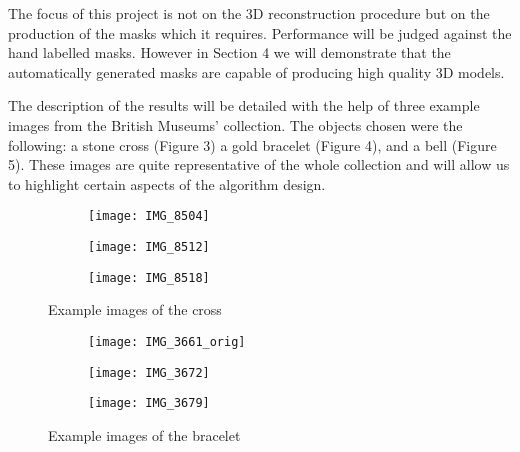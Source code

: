 \documentclass[12pt]{IIBproject}
\begin{document}
The focus of this project is not on the 3D reconstruction procedure but on the production of the masks which it requires. Performance will be judged against the hand labelled masks. However in Section 4 we will demonstrate that the automatically generated masks are capable of producing high quality 3D models.

The description of the results will be detailed with the help of three example images from the British Museums' collection. The objects chosen were the following: a stone cross (Figure 3) a gold bracelet (Figure 4), and a bell (Figure 5). These images are quite representative of the whole collection and will allow us to highlight certain aspects of the algorithm design. 
\begin{figure}[H]
\centering
\begin{subfigure}{.33\textwidth}
  \centering
  \texttt{[image: IMG\_8504]}
  \label{fig:sub1}
\end{subfigure}%
\begin{subfigure}{.33\textwidth}
  \centering
  \texttt{[image: IMG\_8512]}
  \label{fig:sub2}
\end{subfigure}
\begin{subfigure}{.33\textwidth}
  \centering
  \texttt{[image: IMG\_8518]}
  \label{fig:sub2}
\end{subfigure}
\caption{Example images of the cross}
\label{fig:test}
\end{figure}

\begin{figure}[H]
\centering
\begin{subfigure}{.33\textwidth}
  \centering
  \texttt{[image: IMG\_3661\_orig]}
  \label{fig:sub1}
\end{subfigure}%
\begin{subfigure}{.33\textwidth}
  \centering
  \texttt{[image: IMG\_3672]}
  \label{fig:sub2}
\end{subfigure}
\begin{subfigure}{.33\textwidth}
  \centering
  \texttt{[image: IMG\_3679]}
  \label{fig:sub2}
\end{subfigure}
\caption{Example images of the bracelet}
\label{fig:test}
\end{figure}
\end{document}
